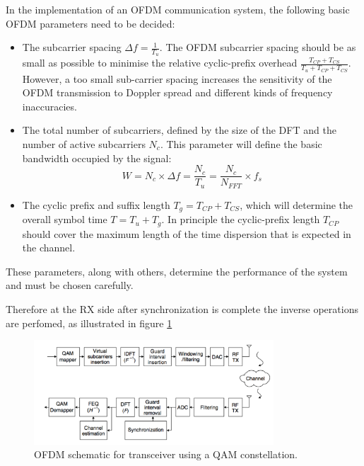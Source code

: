 \documentclass[12pt,a4paper,openright]{report}
\begin{document}
In the implementation of an OFDM communication system, the following basic OFDM parameters need to be decided:
\begin{itemize}
\item The subcarrier spacing $\Delta f = \frac{1}{T_u}$. The OFDM subcarrier spacing should be as small as possible to minimise the relative cyclic-prefix overhead $\frac{T_{CP}+T_{CS}}{T_u + T_{CP} + T_{CS}}$. However, a too small sub-carrier spacing increases the sensitivity of the OFDM transmission to Doppler spread and different kinds of frequency inaccuracies.

\item The total number of subcarriers, defined by the size of the DFT and the number of active subcarriers $N_c$. This parameter will define the basic bandwidth occupied by the signal: 
\begin{equation}\label{eq:OFDMbw}
W = N_c \times \Delta f = \frac{N_c}{T_u}=\frac{N_c}{N_{FFT}}\times f_s
\end{equation}

\item The cyclic prefix and suffix length $T_g = T_{CP} + T_{CS}$, which will determine the overall symbol time $T = T_u + T_g$. In principle the cyclic-prefix length $T_{CP}$ should cover the maximum length of the time dispersion that is expected in the channel. 
\end{itemize}

These parameters, along with others, determine the performance of the system and must be chosen carefully. 

Therefore at the RX side after synchronization is complete the inverse operations are perfomed, as illustrated in figure \ref{fig:ofdmtransceiver}

 \begin{figure}[H]
  \centering
    \includegraphics[width=0.8\textwidth]{ofdmtransceiver.pdf}
    \caption[OFDM transceiver using QAM]{OFDM schematic for transceiver using a QAM constellation.}
    \label{fig:ofdmtransceiver}
\end{figure}
\end{document}
